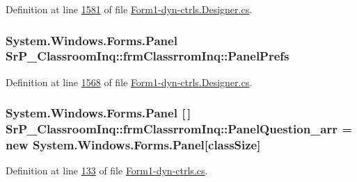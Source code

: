 \-Definition at line \hyperlink{_form1-dyn-ctrls_8_designer_8cs_source_l01581}{1581} of file \hyperlink{_form1-dyn-ctrls_8_designer_8cs_source}{\-Form1-\/dyn-\/ctrls.\-Designer.\-cs}.

\hypertarget{class_sr_p___classroom_inq_1_1frm_classrrom_inq_aac0efdb76f2989a17842359cc1a15ec9}{
\subsubsection[{\-Panel\-Prefs}]{\setlength{\rightskip}{0pt plus 5cm}\-System.\-Windows.\-Forms.\-Panel {\bf \-Sr\-P\-\_\-\-Classroom\-Inq\-::frm\-Classrrom\-Inq\-::\-Panel\-Prefs}}}
\label{class_sr_p___classroom_inq_1_1frm_classrrom_inq_aac0efdb76f2989a17842359cc1a15ec9}


\-Definition at line \hyperlink{_form1-dyn-ctrls_8_designer_8cs_source_l01568}{1568} of file \hyperlink{_form1-dyn-ctrls_8_designer_8cs_source}{\-Form1-\/dyn-\/ctrls.\-Designer.\-cs}.

\hypertarget{class_sr_p___classroom_inq_1_1frm_classrrom_inq_a5c89025435cd16c638fbc91999b74f80}{
\subsubsection[{\-Panel\-Question\-\_\-arr}]{\setlength{\rightskip}{0pt plus 5cm}\-System.\-Windows.\-Forms.\-Panel \mbox{[}$\,$\mbox{]} {\bf \-Sr\-P\-\_\-\-Classroom\-Inq\-::frm\-Classrrom\-Inq\-::\-Panel\-Question\-\_\-arr} = new \-System.\-Windows.\-Forms.\-Panel\mbox{[}{\bf class\-Size}\mbox{]}}}
\label{class_sr_p___classroom_inq_1_1frm_classrrom_inq_a5c89025435cd16c638fbc91999b74f80}


\-Definition at line \hyperlink{_form1-dyn-ctrls_8cs_source_l00133}{133} of file \hyperlink{_form1-dyn-ctrls_8cs_source}{\-Form1-\/dyn-\/ctrls.\-cs}.

